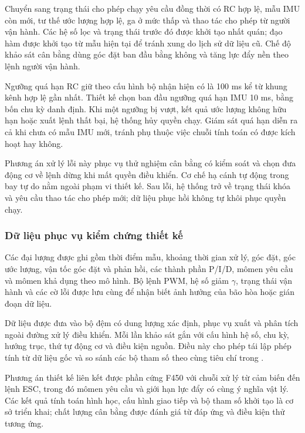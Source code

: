Chuyển sang trạng thái cho phép chạy yêu cầu đồng thời có RC hợp lệ, mẫu IMU còn mới, tư thế ước lượng hợp lệ, ga ở mức thấp và thao tác cho phép từ người vận hành. Các hệ số lọc và trạng thái trước đó được khởi tạo nhất quán; đạo hàm được khởi tạo từ mẫu hiện tại để tránh xung do lịch sử dữ liệu cũ. Chế độ khảo sát cân bằng dùng góc đặt ban đầu bằng không và tăng lực đẩy nền theo lệnh người vận hành.

Ngưỡng quá hạn RC giữ theo cấu hình bộ nhận hiện có là 100 ms kể từ khung kênh hợp lệ gần nhất. Thiết kế chọn ban đầu ngưỡng quá hạn IMU 10 ms, bằng bốn chu kỳ danh định. Khi một ngưỡng bị vượt, kết quả ước lượng không hữu hạn hoặc xuất lệnh thất bại, hệ thống hủy quyền chạy. Giám sát quá hạn diễn ra cả khi chưa có mẫu IMU mới, tránh phụ thuộc việc chuỗi tính toán có được kích hoạt hay không.

Phương án xử lý lỗi này phục vụ thử nghiệm cân bằng có kiểm soát và chọn đưa động cơ về lệnh dừng khi mất quyền điều khiển. Cơ chế hạ cánh tự động trong bay tự do nằm ngoài phạm vi thiết kế. Sau lỗi, hệ thống trở về trạng thái khóa và yêu cầu thao tác cho phép mới; dữ liệu phục hồi không tự khôi phục quyền chạy.

\subsubsection{Dữ liệu phục vụ kiểm chứng thiết kế}

Các đại lượng được ghi gồm thời điểm mẫu, khoảng thời gian xử lý, góc đặt, góc ước lượng, vận tốc góc đặt và phản hồi, các thành phần P/I/D, mômen yêu cầu và mômen khả dụng theo mô hình. Bộ lệnh PWM, hệ số giảm $\gamma$, trạng thái vận hành và các cờ lỗi được lưu cùng để nhận biết ảnh hưởng của bão hòa hoặc gián đoạn dữ liệu.

Dữ liệu được đưa vào bộ đệm có dung lượng xác định, phục vụ xuất và phân tích ngoài đường xử lý điều khiển. Mỗi lần khảo sát gắn với cấu hình hệ số, chu kỳ, hướng trục, thứ tự động cơ và điều kiện nguồn. Điều này cho phép tái lập phép tính từ dữ liệu gốc và so sánh các bộ tham số theo cùng tiêu chí trong .

Phương án thiết kế liên kết được phần cứng F450 với chuỗi xử lý từ cảm biến đến lệnh ESC, trong đó mômen yêu cầu và giới hạn lực đẩy có cùng ý nghĩa vật lý. Các kết quả tính toán hình học, cấu hình giao tiếp và bộ tham số khởi tạo là cơ sở triển khai; chất lượng cân bằng được đánh giá từ đáp ứng và điều kiện thử tương ứng.
